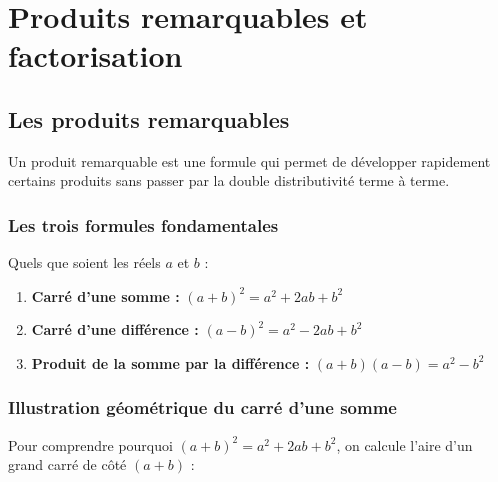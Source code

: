 \documentclass[../main.tex]{subfiles}
\begin{document}
\ifSubfilesClassLoaded{\PageLegaleChapitre}{}

\chapter{Produits remarquables et factorisation}
\label{chap:produits-remarquables}

\section{Les produits remarquables}

Un produit remarquable est une formule qui permet de développer rapidement certains produits sans passer par la double distributivité terme à terme.

\subsection{Les trois formules fondamentales}

\begin{propriete}
Quels que soient les réels $a$ et $b$ :
\begin{enumerate}[label=\textbf{(\arabic*)}]
  \item \textbf{Carré d'une somme :} $(a + b)^2 = a^2 + 2ab + b^2$
  \item \textbf{Carré d'une différence :} $(a - b)^2 = a^2 - 2ab + b^2$
  \item \textbf{Produit de la somme par la différence :} $(a + b)(a - b) = a^2 - b^2$
\end{enumerate}
\end{propriete}

\subsection{Illustration géométrique du carré d'une somme}

Pour comprendre pourquoi $(a+b)^2 = a^2 + 2ab + b^2$, on calcule l'aire d'un grand carré de côté $(a+b)$ :

\begin{center}
\end{center}
\end{document}
